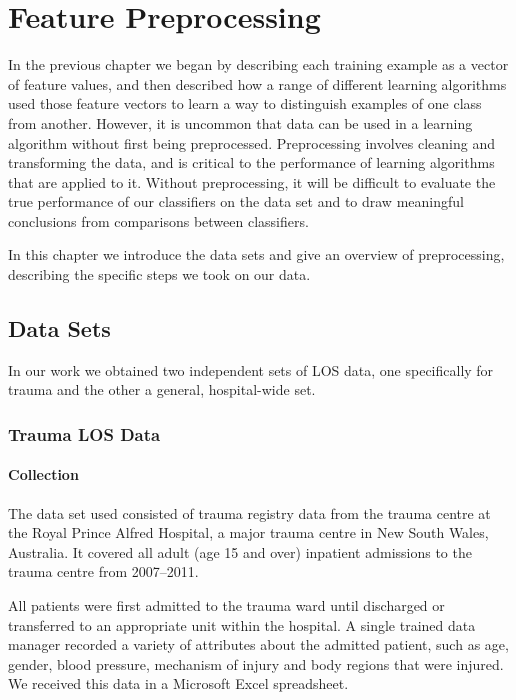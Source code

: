 \chapter{Feature Preprocessing} \label{chap:preprocess}

In the previous chapter we began by describing each training example as a
vector of feature values, and then described how a range of different
learning algorithms used those feature vectors to learn a way to
distinguish examples of one class from another. However, it is uncommon that
data can be used in a learning algorithm without first being preprocessed.
Preprocessing involves cleaning and transforming the data, and is critical
to the performance of learning algorithms that are applied to it. Without
preprocessing, it will be difficult to evaluate the true performance of
our classifiers on the data set and to draw meaningful conclusions from
comparisons between classifiers.

In this chapter we introduce the data sets and give an overview of
preprocessing, describing the specific steps we took on our data.

\section{Data Sets}
In our work we obtained two independent sets of LOS data, one specifically for
trauma and the other a general, hospital-wide set.

\subsection{Trauma LOS Data}
\subsubsection{Collection}
The data set used consisted of trauma registry data from the trauma centre
at the Royal Prince Alfred Hospital, a major trauma centre in New South Wales,
Australia. It covered all adult (age 15 and over) inpatient admissions to the
trauma centre from 2007--2011. 

All patients were first admitted to the trauma ward until discharged
or transferred to an appropriate unit within the hospital. A single trained
data manager recorded a variety of attributes about the admitted patient,
such as age, gender, blood pressure, mechanism of injury and body regions
that were injured. We received this data in a Microsoft Excel spreadsheet.

